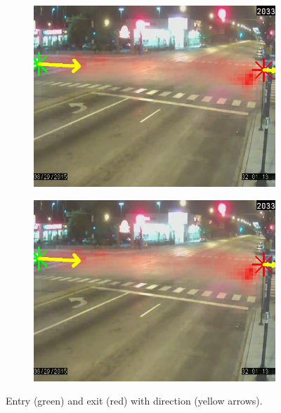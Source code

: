 \begin{figure}
\begin{subfigure}{0.32\linewidth}
            \includegraphics[width=\linewidth]{./img/scene_learning/res/ciceroPeterson/20150829_020000DST_ciceroPeterson-5.jpg}
        \end{subfigure}
        \begin{subfigure}{0.32\linewidth}
            \includegraphics[width=\linewidth]{./img/scene_learning/res/ciceroPeterson/20150829_020000DST_ciceroPeterson-5.jpg}
        \end{subfigure}
        \caption{Entry (green) and exit (red) with direction (yellow arrows).}
        \label{fig:entry-exit-full-3}
\end{figure}

